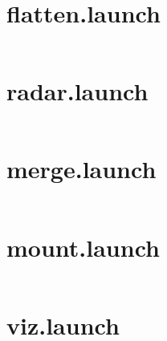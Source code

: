 \section{flatten.launch}
\label{Appdix:flatten.launch}
\inputminted{xml}{ros_system/launch/src/sublaunch/flatten.launch}

\section{radar.launch}
\label{Appdix:radar.launch}
\inputminted{xml}{ros_system/launch/src/sublaunch/radar.launch}

\section{merge.launch}
\label{Appdix:merge.launch}
\inputminted{xml}{ros_system/launch/src/sublaunch/merge.launch}

\section{mount.launch}
\label{Appdix:mount.launch}
\inputminted{xml}{ros_system/launch/src/sublaunch/mount.launch}

\section{viz.launch}
\label{Appdix:viz.launch}
\inputminted{xml}{ros_system/launch/src/sublaunch/viz.launch}


